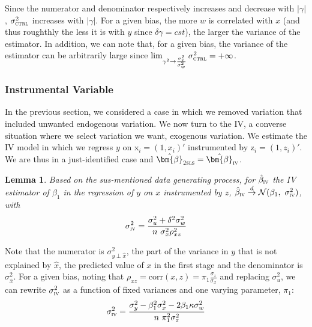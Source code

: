 \documentclass[usletter, 12pt]{article}
\newtheorem{lemma}{Lemma}
\begin{document}
				Since the numerator and denominator respectively increases and decrease with $|\gamma|$,  $\sigma_{\textsc{ctrl}}^{2}$ increases with $|\gamma|$. For a given bias, the more $w$ is correlated with $x$ (and thus roughthly the less it is with $y$ since $\delta \gamma = cst$), the larger the variance of the estimator. In addition, we can note that, for a given bias, the variance of the estimator can be arbitrarily large since $\lim_{\gamma^{2} \to \frac{\sigma_{x}^{2}}{\sigma_{w}^{2}}} \sigma_{\textsc{ctrl}}^{2} = + \infty$.
				
			
		
		\subsubsection{Instrumental Variable}
		
			In the previous section, we considered a case in which we removed variation that included unwanted endogenous variation. We now turn to the IV, a converse situation where we select variation we want, exogenous variation. We estimate the IV model in which we regress $y$ on $\text{x}_{i} = (1, x_{i})'$ instrumented by $\text{z}_{i} = (1, z_{i})'$. We are thus in a just-identified case and $\hat{\bm{\beta}}_{\textsc{2sls}} = \hat{\bm{\beta}}_{\textsc{iv}}$.						
			\begin{lemma}\label{lemma_iv}
				Based on the sus-mentioned data generating process, for $\hat{\beta}_{\textsc{iv}}$ the IV estimator of $\beta_{1}$ in the regression of $y$ on $x$ instrumented by $z$,  $\hat{\beta}_{\textsc{iv}} \overset{d}{\to} \mathcal{N}(\beta_{1}, \ \sigma_{\textsc{iv}}^{2})$, with
					\[
						\sigma_{\textsc{iv}}^{2} = \dfrac{\sigma_{u}^{2} + \delta^{2}\sigma_{w}^{2}}{n \ \sigma_{x}^{2} \rho_{xz}^{2}}
					\]
			\end{lemma}
			
			Note that the numerator is $\sigma_{y \perp \hat{x}}^{2}$, the part of the variance in $y$ that is not explained by $\hat{x}$, the predicted value of $x$ in the first stage and the denominator is $\sigma_{\hat{x}}^{2}$. For a given bias, noting that $\rho_{xz} = \text{corr}(x, z) = \pi_1 \frac{\sigma_z}{\sigma_x}$ and replacing $\sigma_{u}^{2}$, we can rewrite $\sigma_{\textsc{iv}}^{2}$ as a function of fixed variances and one varying parameter, $\pi_{1}$:
			\[
				\sigma_{\textsc{iv}}^{2} = \dfrac{\sigma_{y}^{2} - \beta_{1}^{2}\sigma_{x}^{2} - 2\beta_{1}\kappa \sigma_{w}^{2}}{n \ \pi_{1}^{2} \sigma_{z}^{2}}
			\]
			
\end{document}
